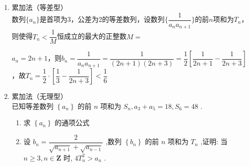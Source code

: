 \begin{enumerate}
\begin{enumerate}
        已知等差数列$\{a_n\}$和等比数列$\{b_n\}$均单调递增，前$n$项和分别为$S_n$和$T_n$，且满足$a_1 = b_1, a_3 = b_3, S_3 = 15, T_3 = 14$，则$a_n = $；$b_n = $；设$c_n = \dfrac{a_n}{b_n}$，则$\{c_n\}$的前$n$项和$R_n = $
        \begin{jieda}
            $S_3 = 15 \Rightarrow a_2 = 5$，又因为$T_3 = 14, a_1 = b_1, a_3 = b_3$，故$b_2 = 4$，因此$(5-d)(5+d) = 16$，解得公差$d = 3$或$-3$（舍）,故$a_n = 3n-1$，$b_1 = a_1 = 2, b_3 = a_3 = 8$，故公比$q = 2$，故$b_n = 2^n$. \\
            $c_n = \dfrac{a_n}{b_n} = (3n-1) \cdot (\dfrac{1}{2})^n$，$\left \{ \begin{array}{l}
                 R_n = 2 \times \dfrac{1}{2} + 5 \times \dfrac{1}{4} + \cdots + (3n-4) \times \dfrac{1}{2^{n-1}} + (3n-1) \times \dfrac{1}{2^n}  \\
                 \dfrac{1}{2}R_n = 2 \times \dfrac{1}{4} + 5 \times \dfrac{1}{8} + \cdots + (3n-4) \times \dfrac{1}{2^n} + (3n-1) \times \dfrac{1}{2^{n+1}}
            \end{array}\right. $ \\
            故$\dfrac{1}{2}R_n = 1 + 3 \times (\dfrac{1}{4} + \dfrac{1}{8} + \cdots + \dfrac{1}{2^n}) - (3n-1)\times \dfrac{1}{2^{n+1}} = 1 + 3 \times(\dfrac{1}{2} - \dfrac{1}{2^n}) - (3n-1)\times \dfrac{1}{2^{n+1}} = \dfrac{5}{2} - \dfrac{6 + (3n-1)}{2^{n+1}} = \dfrac{5}{2} - \dfrac{5+3n}{2^{n+1}}$，故$R_n = 5 - \dfrac{5+3n}{2^n}$
        \end{jieda}
        
        \item 累加法（等差型） \\
        数列$\{a_n\}$是首项为3，公差为2的等差数列，设数列$\{\dfrac{1}{a_n a_{n+1}}\}$的前$n$项和为$T_n$，则使得$T_n < \dfrac{1}{M}$恒成立的最大的正整数$M = $
        \begin{jieda}
            $a_n = 2n+1$，则$b_n = \dfrac{1}{a_n a_{n+1}} = \dfrac{1}{(2n+1)(2n+3)} = \dfrac{1}{2}\left [\dfrac{1}{2n+1} - \dfrac{1}{2n+3}\right]$，故$T_n = \dfrac{1}{2}\cdot \left [\dfrac{1}{3} - \dfrac{1}{2n+3}\right] < \dfrac{1}{6}$
        \end{jieda}
    
        \item 累加法（无理型） \\
        已知等差数列 $ \left\{  {a}_{n}\right\} $ 的前 $ n $ 项和为 $ {S}_{n},{a}_{3} + {a}_{5} = {18},{S}_{6} = {48} $ .
        \begin{enumerate}
            \item 求 $ \left\{  {a}_{n}\right\} $ 的通项公式
            \item 设 $ {b}_{n} = \dfrac{2}{\sqrt{{a}_{n + 1}} + \sqrt{{a}_{n - 1}}} $ ,数列 $ \left\{  {b}_{n}\right\} $ 的前 $ n $ 项和为 $ {T}_{n} $ ,证明: 当 $ n \geq  3,n \in  \mathbf{Z} $ 时, $ 4{T}_{n}^{2} > {a}_{n} $ .
        \end{enumerate}
        

\end{enumerate}
\end{enumerate}
